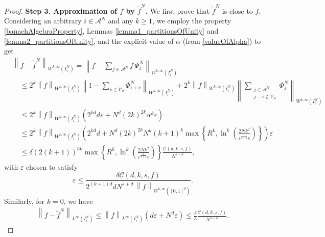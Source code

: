 \documentclass{article}
\newcommand{\fr}{\frac}
\newcommand{\be}{\begin{equation}}
\newcommand{\ee}{\end{equation}}
\newcommand{\LnormD}[3]{\left\lVert #1 \right\rVert_{L^{#2} \left({#3}\right)}}
\newcommand{\WnormD}[4]{\left\lVert #1 \right\rVert_{W^{#2, #3} ({#4})}}
\newcommand{\WnormO}[3]{\left\lVert #1 \right\rVert_{W^{#2, #3} ([0,1]^d)}}
\numberwithin{Def}{section}
\begin{document}
\begin{proof}
{\bf{Step 3. Approximation of $f$ by $\tilde{f}^N$.}} We first prove that $\tilde{f}^N$ is close to $f$. Considering an arbitrary $i \in \mathcal{A}^N$ and any $k \geq 1$, we employ the property \ref{banachAlgebraProperty}, Lemmas \ref{lemma1_partitionsOfUnity} and \ref{lemma2_partitionsOfUnity}, and the explicit value of $\alpha$ (from \eqref{valueOfAlpha}) to get
\be\begin{aligned}
    &\WnormD{f - \tilde{f}^N}{k}{\infty}{I_i^N} = \WnormD{f - \sum_{j \in \mathcal{A}^N} f \, \Phi_j^{N}}{k}{\infty}{I_i^N} \\
    &\quad \leq 2^k \WnormD{f}{k}{\infty}{I_i^N} \WnormD{1 - \sum_{v \in \mathcal{V}_d} \Phi_{i+v}^{N}}{k}{\infty}{I_i^N} + 2^k \WnormD{f}{k}{\infty}{I_i^N} \WnormD{\sum_{\substack{j \in \mathcal{A^N} \\ j-i \notin \mathcal{V}_d}} \Phi_j^{N}}{k}{\infty}{I_i^N} \\
    &\quad \leq 2^k \WnormD{f}{k}{\infty}{I_i^N} \left(2^{kd}d \varepsilon + N^d (2k)^{2k} \alpha^k \varepsilon \right) \\
    &\quad \leq 2^k \WnormD{f}{k}{\infty}{I_i^N} \left(2^{kd}d + N^d (2k)^{2k} N^k (k+1)^k \max \left\{R^k, \ln^k \left( \fr{2Nk^2}{\varepsilon^\fr{1}{k+1} e} \right) \right\} \right) \varepsilon \\
    &\quad \leq \delta (2(k+1))^{3k} \max \left\{R^k, \ln^k \left( \fr{2Nk^2}{\varepsilon^\fr{1}{k+1} e} \right) \right\} \fr{\mathcal{C}(d,k,s,f)}{N^{s-k}},
\end{aligned}\ee
with $\varepsilon$ chosen to satisfy
\begin{equation}
    \varepsilon \leq \fr{\delta \mathcal{C} (d,k,s,f)}{2^{(k+1) d} d N^{s+d} \, \WnormO{f}{k}{\infty}}.
\end{equation}
Similarly, for $k=0$, we have
\be\begin{aligned}
    \LnormD{f - \tilde{f}^N}{\infty}{I_i^N} \leq \LnormD{f}{\infty}{I_i^N} (d\varepsilon + N^d \varepsilon) \leq \fr{\delta}{3} \fr{\mathcal{C}(d,k,s,f)}{N^{s-k}}.
\end{aligned}\ee


\end{proof}
\end{document}
